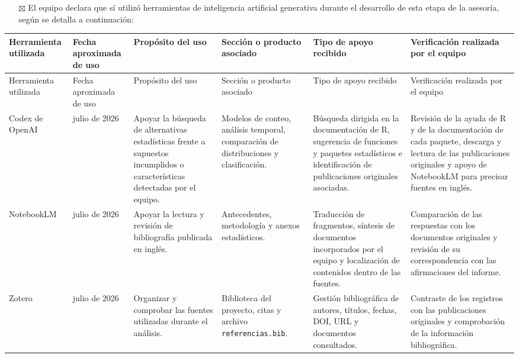 \documentclass[
  spanish,
  letterpaper,
  DIV=11,
  numbers=noendperiod]{scrartcl}
\providecommand{\tightlist}{%
  \setlength{\itemsep}{0pt}\setlength{\parskip}{0pt}}
\begin{document}
\begin{itemize}
\tightlist
\item[$\boxtimes$]
  El equipo declara que sí utilizó herramientas de inteligencia
  artificial generativa durante el desarrollo de esta etapa de la
  asesoría, según se detalla a continuación:
\end{itemize}

\begingroup
\scriptsize
\setlength{\tabcolsep}{2.5pt}
\renewcommand{\arraystretch}{1.16}
{}
\label{tbl-declaracion-uso-ia}
\hypertarget{dest-tbl-declaracion-uso-ia}{}

\begin{longtable*}{>{\raggedright\arraybackslash}p{0.12\textwidth}>{\raggedright\arraybackslash}p{0.09\textwidth}>{\raggedright\arraybackslash}p{0.18\textwidth}>{\raggedright\arraybackslash}p{0.17\textwidth}>{\raggedright\arraybackslash}p{0.18\textwidth}>{\raggedright\arraybackslash}p{0.18\textwidth}}
\toprule
Herramienta utilizada & Fecha aproximada de uso & Propósito del uso & Sección o producto asociado & Tipo de apoyo recibido & Verificación realizada por el equipo \\
\midrule
\endfirsthead
\toprule
Herramienta utilizada & Fecha aproximada de uso & Propósito del uso & Sección o producto asociado & Tipo de apoyo recibido & Verificación realizada por el equipo \\
\midrule
\endhead
Codex de OpenAI & julio de 2026 & Apoyar la búsqueda de alternativas estadísticas frente a supuestos incumplidos o características detectadas por el equipo. & Modelos de conteo, análisis temporal, comparación de distribuciones y clasificación. & Búsqueda dirigida en la documentación de R, sugerencia de funciones y paquetes estadísticos e identificación de publicaciones originales asociadas. & Revisión de la ayuda de R y de la documentación de cada paquete, descarga y lectura de las publicaciones originales y apoyo de NotebookLM para precisar fuentes en inglés. \\
NotebookLM & julio de 2026 & Apoyar la lectura y revisión de bibliografía publicada en inglés. & Antecedentes, metodología y anexos estadísticos. & Traducción de fragmentos, síntesis de documentos incorporados por el equipo y localización de contenidos dentro de las fuentes. & Comparación de las respuestas con los documentos originales y revisión de su correspondencia con las afirmaciones del informe. \\
Zotero & julio de 2026 & Organizar y comprobar las fuentes utilizadas durante el análisis. & Biblioteca del proyecto, citas y archivo \texttt{referencias.bib}. & Gestión bibliográfica de autores, títulos, fechas, DOI, URL y documentos consultados. & Contraste de los registros con las publicaciones originales y comprobación de la información bibliográfica. \\

\end{longtable*}
\end{document}
